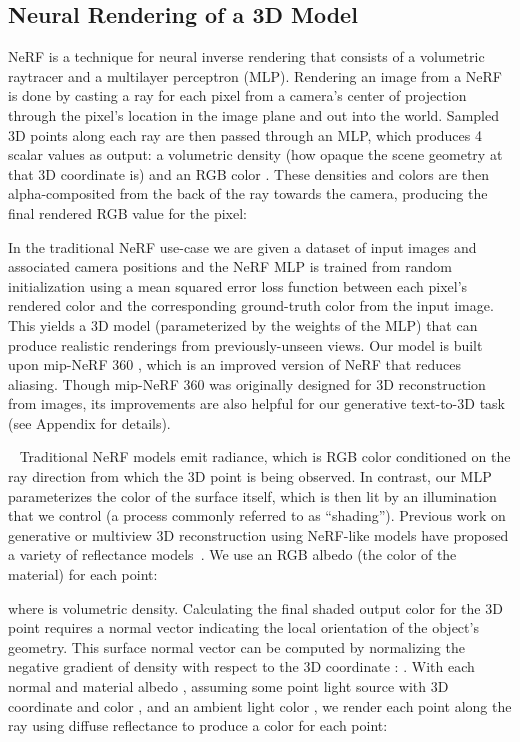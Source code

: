 \documentclass{article} \usepackage{iclr2023_conference,times}
\newcommand{\myparagraph}[1]{\noindent {\bf #1}\,\,\,}
\begin{document}
\subsection{Neural Rendering of a 3D Model}
\label{sec:nerf}
NeRF is a technique for neural inverse rendering that consists of a volumetric raytracer and a multilayer perceptron (MLP). Rendering an image from a NeRF is done by casting a ray for each pixel from a camera's center of projection through the pixel's location in the image plane and out into the world. Sampled 3D points  along each ray are then passed through an MLP, which produces 4 scalar values as output: a volumetric density  (how opaque the scene geometry at that 3D coordinate is) and an RGB color . These densities and colors are then alpha-composited from the back of the ray towards the camera, producing the final rendered RGB value for the pixel:

In the traditional NeRF use-case we are given a dataset of input images and associated camera positions and the NeRF MLP is trained from random initialization using a mean squared error loss function between each pixel's rendered color and the corresponding ground-truth color from the input image. 
This yields a 3D model (parameterized by the weights of the MLP) that can produce realistic renderings from previously-unseen views. 
Our model is built upon mip-NeRF 360 \citep{Barron2021MipNeRF3U}, which is an improved version of NeRF that reduces aliasing. Though mip-NeRF 360 was originally designed for 3D reconstruction from images,  its improvements are also helpful for our generative text-to-3D task (see Appendix for details).




\myparagraph{Shading.}
Traditional NeRF models emit radiance, which is RGB color conditioned on the ray direction from which the 3D point is being observed.
In contrast, our MLP parameterizes the color of the surface itself, which is then lit by an illumination that we control (a process commonly referred to as ``shading'').
Previous work on generative or multiview 3D reconstruction using NeRF-like models have proposed a variety of reflectance models~\citep{bi2020neural,boss2021nerd,srinivasan2021nerv,pan2022gan2x}.
We use an RGB albedo  (the color of the material) for each point:

where  is volumetric density. Calculating the final shaded output color for the 3D point requires a normal vector indicating the local orientation of the object's geometry. This  surface normal vector can be computed by normalizing the negative gradient of density  with respect to the 3D coordinate :  \citep{yariv2020idr,srinivasan2021nerv}.
With each normal  and material albedo , assuming some point light source with 3D coordinate  and color , and an ambient light color , we render each point along the ray using diffuse reflectance \citep{lambert1760photometria, Ramamoorthi2001ASF} to produce a color  for each point:
\end{document}
